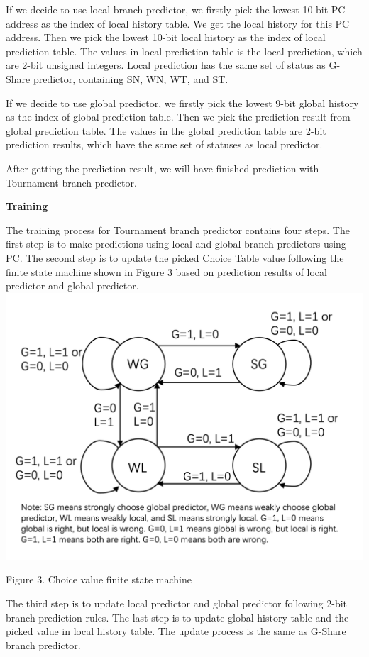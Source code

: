 \documentclass[conference]{IEEEtran}
\begin{document}
If we decide to use local branch predictor, we firstly pick the lowest 10-bit PC address as the index of local history table. 
We get the local history for this PC address. Then we pick the lowest 10-bit local history as the index of local prediction table. The values in local prediction table is the local prediction, which are 2-bit unsigned integers. 
Local prediction has the same set of status as G-Share predictor, containing SN, WN, WT, and ST. 

If we decide to use global predictor, we firstly pick the lowest 9-bit global history as the index of global prediction table. Then we pick the prediction result from global prediction table. 
The values in the global prediction table are 2-bit prediction results, which have the same set of statuses as local predictor. 

After getting the prediction result, we will have finished prediction with Tournament branch predictor. 

\begin{center}
  \textbf{Training}
\end{center}
The training process for Tournament branch predictor contains four steps. The first step is to make predictions using local and global branch predictors using PC. The second step is to update the 
picked Choice Table value following the finite state machine shown in Figure 3 based on prediction results of local predictor and global predictor.
\includegraphics[width=\linewidth]{choice-machine.png}
\begin{center}
  {\small Figure 3. Choice value finite state machine}
\end{center}
The third step is to update local predictor and global predictor following 2-bit branch prediction rules. The last step is to update global history table and the picked value in local history table. The 
update process is the same as G-Share branch predictor. 
\end{document}

